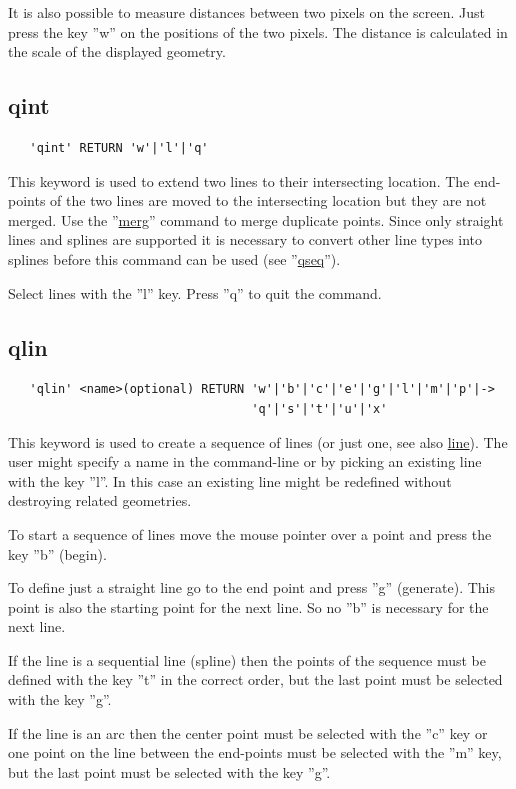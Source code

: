 \documentclass{article}
\providecommand{\htmlref}[2]{\hyperref[#2]{#1}}
\begin{document}
It is also possible to measure distances between two pixels on the screen. Just press the key ''w'' on the positions of the two pixels. The distance is calculated in the scale of the displayed geometry.

\subsection{\label{qint}qint}
\begin{verbatim}
   'qint' RETURN 'w'|'l'|'q'
\end{verbatim}
This keyword is used to extend two lines to their intersecting location. The end-points of the two lines are moved to the intersecting location but they are not merged. Use the ''\htmlref{merg}{merg}'' command to merge duplicate points. Since only straight lines and splines are supported it is necessary to convert other line types into splines before this command can be used (see ''\htmlref{qseq}{qseq}'').

Select lines with the ''l'' key. Press ''q'' to quit the command.

\subsection{\label{qlin}qlin}
\begin{verbatim}
   'qlin' <name>(optional) RETURN 'w'|'b'|'c'|'e'|'g'|'l'|'m'|'p'|->
                                  'q'|'s'|'t'|'u'|'x'
\end{verbatim}
This keyword is used to create a sequence of lines (or just one, see also \htmlref{line}{line}). The user might specify a name in the command-line or by picking an existing line with the key ''l''. In this case an existing line might be redefined without destroying related geometries.

To start a sequence of lines move the mouse pointer over a point and press the key ''b'' (begin).

To define just a straight line go to the end point and press ''g'' (generate). This point is also the starting point for the next line. So no ''b'' is necessary for the next line.

If the line is a sequential line (spline) then the points of the sequence must be defined with the key ''t'' in the correct order, but the last point must be selected with the key ''g''.

If the line is an arc then the center point must be selected with the ''c'' key or one point on the line between the end-points must be selected with the ''m'' key, but the last point must be selected with the key ''g''.
\end{document}
